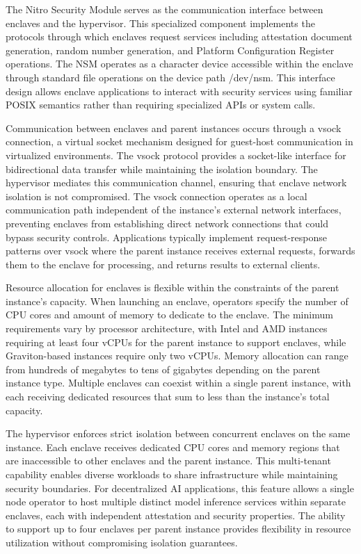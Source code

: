 The Nitro Security Module serves as the communication interface between enclaves and the hypervisor. This specialized component implements the protocols through which enclaves request services including attestation document generation, random number generation, and Platform Configuration Register operations. The NSM operates as a character device accessible within the enclave through standard file operations on the device path /dev/nsm. This interface design allows enclave applications to interact with security services using familiar POSIX semantics rather than requiring specialized APIs or system calls.

Communication between enclaves and parent instances occurs through a vsock connection, a virtual socket mechanism designed for guest-host communication in virtualized environments. The vsock protocol provides a socket-like interface for bidirectional data transfer while maintaining the isolation boundary. The hypervisor mediates this communication channel, ensuring that enclave network isolation is not compromised. The vsock connection operates as a local communication path independent of the instance's external network interfaces, preventing enclaves from establishing direct network connections that could bypass security controls. Applications typically implement request-response patterns over vsock where the parent instance receives external requests, forwards them to the enclave for processing, and returns results to external clients.

Resource allocation for enclaves is flexible within the constraints of the parent instance's capacity. When launching an enclave, operators specify the number of CPU cores and amount of memory to dedicate to the enclave. The minimum requirements vary by processor architecture, with Intel and AMD instances requiring at least four vCPUs for the parent instance to support enclaves, while Graviton-based instances require only two vCPUs. Memory allocation can range from hundreds of megabytes to tens of gigabytes depending on the parent instance type. Multiple enclaves can coexist within a single parent instance, with each receiving dedicated resources that sum to less than the instance's total capacity.

The hypervisor enforces strict isolation between concurrent enclaves on the same instance. Each enclave receives dedicated CPU cores and memory regions that are inaccessible to other enclaves and the parent instance. This multi-tenant capability enables diverse workloads to share infrastructure while maintaining security boundaries. For decentralized AI applications, this feature allows a single node operator to host multiple distinct model inference services within separate enclaves, each with independent attestation and security properties. The ability to support up to four enclaves per parent instance provides flexibility in resource utilization without compromising isolation guarantees.

